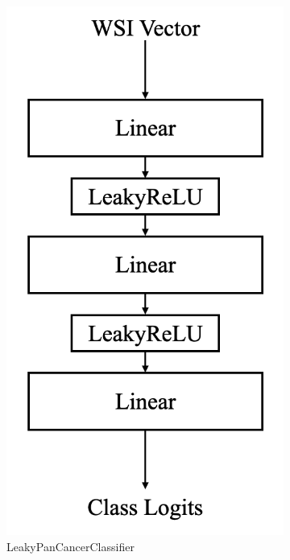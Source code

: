 \documentclass{l4proj}
\begin{document}
\begin{figure}[]
\begin{subfigure}[b]{0.3\textwidth}
        \includegraphics[width=\textwidth]{images/leakyclassifier.png}
        \caption{LeakyPanCancerClassifier}
        \label{fig:leakypancancerclassifier}
    \end{subfigure}
    \vfill
    \begin{subfigure}[b]{0.3\textwidth}

\end{subfigure}
\end{figure}
\end{document}
